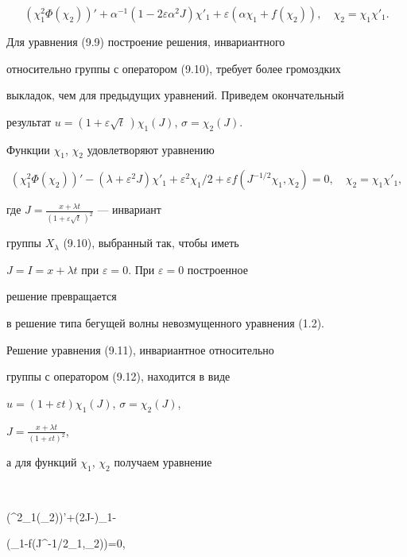 $$ 


(\chi^2_1\Phi(\chi_2))'+\alpha^{-1}(1-2\varepsilon\alpha^2J) 


\chi'_1+\varepsilon(\alpha\chi_1+f(\chi_2)),\quad 


\chi_2=\chi_1\chi'_1. 


$$ 


 


Для уравнения (9.9) построение решения, инвариантного 


относительно группы с оператором (9.10), требует более громоздких 


выкладок, чем для предыдущих уравнений. Приведем окончательный 


результат $u=(1+\varepsilon\sqrt{t}\,)\chi_1(J)$, $\sigma=\chi_2(J)$. 


Функции $\chi_1$, $\chi_2$ удовлетворяют уравнению 


$$ 


(\chi^2_1\Phi(\chi_2))'-(\lambda+\varepsilon^2J)\chi'_1+ 


\varepsilon^2\chi_1/2+\varepsilon f(J^{-1/2}\chi_1,\chi_2)=0,\quad 


\chi_2=\chi_1\chi'_1, 


$$ 


где $J=\frac{x+\lambda t}{(1+\varepsilon\sqrt{t}\,)^2}$ --- инвариант 


группы $X_\lambda$ (9.10), выбранный так, чтобы иметь 


$J=I=x+\lambda t$ при $\varepsilon=0$. При $\varepsilon=0$ построенное 


решение превращается 


в решение типа бегущей волны невозмущенного уравнения (1.2). 


 


Решение уравнения (9.11), инвариантное относительно 


группы с оператором (9.12), находится в виде 


$u=(1+\varepsilon t)\chi_1(J)$, $\sigma=\chi_2(J)$, 


$J=\frac{x+\lambda{}t}{(1+\varepsilon{}t)^2}$, 


а для функций $\chi_1$, $\chi_2$ получаем уравнение 


$$ 


(\chi^2_1\Phi(\chi_2))'+(2\varepsilon J-\lambda)\chi_1- 


\varepsilon(\chi_1-f(J^{-1/2}\chi_1,\chi_2))=0,\quad 


